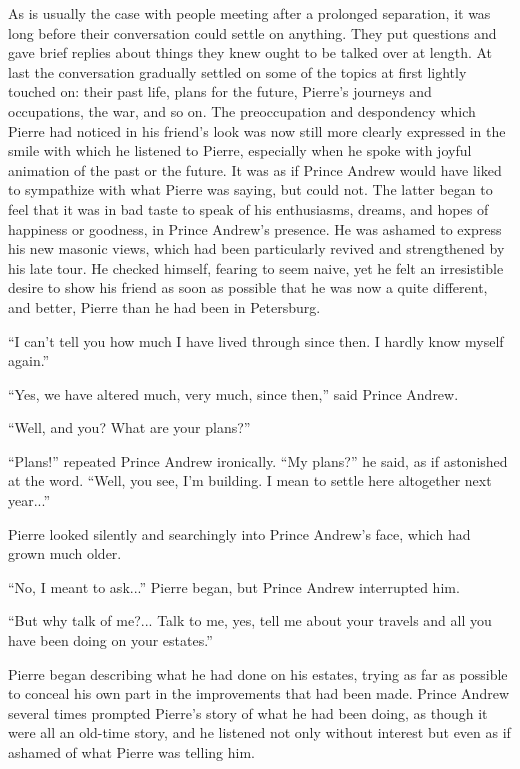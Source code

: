 As is usually the case with people meeting after a prolonged
separation, it was long before their conversation could settle on
anything. They put questions and gave brief replies about things
they knew ought to be talked over at length. At last the
conversation gradually settled on some of the topics at first
lightly touched on: their past life, plans for the future,
Pierre's journeys and occupations, the war, and so on.  The
preoccupation and despondency which Pierre had noticed in his
friend's look was now still more clearly expressed in the smile
with which he listened to Pierre, especially when he spoke with
joyful animation of the past or the future. It was as if Prince
Andrew would have liked to sympathize with what Pierre was
saying, but could not. The latter began to feel that it was in
bad taste to speak of his enthusiasms, dreams, and hopes of
happiness or goodness, in Prince Andrew's presence. He was
ashamed to express his new masonic views, which had been
particularly revived and strengthened by his late tour.  He
checked himself, fearing to seem naive, yet he felt an
irresistible desire to show his friend as soon as possible that
he was now a quite different, and better, Pierre than he had been
in Petersburg.

``I can't tell you how much I have lived through since then. I
hardly know myself again.''

``Yes, we have altered much, very much, since then,'' said Prince
Andrew.

``Well, and you? What are your plans?''

``Plans!'' repeated Prince Andrew ironically. ``My plans?'' he
said, as if astonished at the word. ``Well, you see, I'm
building. I mean to settle here altogether next year...''

Pierre looked silently and searchingly into Prince Andrew's face,
which had grown much older.

``No, I meant to ask...'' Pierre began, but Prince Andrew
interrupted him.

``But why talk of me?... Talk to me, yes, tell me about your
travels and all you have been doing on your estates.''

Pierre began describing what he had done on his estates, trying
as far as possible to conceal his own part in the improvements
that had been made. Prince Andrew several times prompted Pierre's
story of what he had been doing, as though it were all an
old-time story, and he listened not only without interest but
even as if ashamed of what Pierre was telling him.

